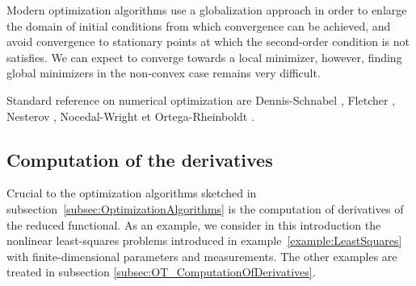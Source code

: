 Modern optimization algorithms use a globalization approach in order to enlarge the domain of initial conditions from which convergence can be achieved, and avoid convergence to stationary points at which the second-order condition is not satisfies. We can expect to converge towards a local minimizer, however, finding global minimizers in the non-convex case remains very difficult.

Standard reference on numerical optimization are  Dennis-Schnabel \cite{DennisSchnabel96}, Fletcher \cite{Fletcher01}, Nesterov \cite{Nesterov04}, Nocedal-Wright \cite{NocedalWright06} et Ortega-Rheinboldt \cite{OrtegaRheinboldt00}.

%
\subsection{Computation of the derivatives}\label{subsec:ComputationDerivativesReduces}
%
Crucial to the optimization algorithms sketched in subsection~\ref{subsec:OptimizationAlgorithms} is the computation of derivatives of the reduced functional.
As an example, we consider in this introduction the nonlinear least-squares problems introduced in example~\ref{example:LeastSquares} with finite-dimensional parameters and measurements. The other examples are treated in subsection \ref{subsec:OT_ComputationOfDerivatives}.

